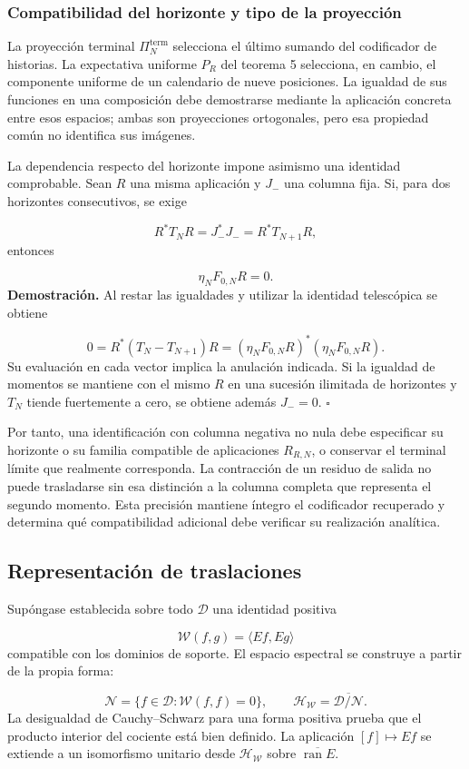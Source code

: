 \subsubsection*{Compatibilidad del horizonte y tipo de la proyección}
La proyección terminal \(\Pi_N^{\mathrm{term}}\) selecciona el último sumando del codificador de historias. La expectativa uniforme \(P_R\) del teorema 5 selecciona, en cambio, el componente uniforme de un calendario de nueve posiciones. La igualdad de sus funciones en una composición debe demostrarse mediante la aplicación concreta entre esos espacios; ambas son proyecciones ortogonales, pero esa propiedad común no identifica sus imágenes.

La dependencia respecto del horizonte impone asimismo una identidad comprobable. Sean \(R\) una misma aplicación y \(J_-\) una columna fija. Si, para dos horizontes consecutivos, se exige

\[
R^*T_NR=J_-^*J_-=R^*T_{N+1}R,
\]
entonces

\[
\eta_NF_{0,N}R=0.
\]
\textbf{Demostración.} Al restar las igualdades y utilizar la identidad telescópica se obtiene

\[
0=R^*(T_N-T_{N+1})R
=(\eta_NF_{0,N}R)^*(\eta_NF_{0,N}R).
\]
Su evaluación en cada vector implica la anulación indicada. Si la igualdad de momentos se mantiene con el mismo \(R\) en una sucesión ilimitada de horizontes y \(T_N\) tiende fuertemente a cero, se obtiene además \(J_-=0\). \hfill\(\square\)

Por tanto, una identificación con columna negativa no nula debe especificar su horizonte o su familia compatible de aplicaciones \(R_{R,N}\), o conservar el terminal límite que realmente corresponda. La contracción de un residuo de salida no puede trasladarse sin esa distinción a la columna completa que representa el segundo momento. Esta precisión mantiene íntegro el codificador recuperado y determina qué compatibilidad adicional debe verificar su realización analítica.

\subsection{Representación de traslaciones}
Supóngase establecida sobre todo \(\mathcal D\) una identidad positiva

\[
\mathscr W(f,g)=\langle Ef,Eg\rangle
\]
compatible con los dominios de soporte. El espacio espectral se construye a partir de la propia forma:

\[
\mathcal N=\{f\in\mathcal D:\mathscr W(f,f)=0\},\qquad
\mathcal H_{\mathscr W}
=\overline{\mathcal D/\mathcal N}.
\]
La desigualdad de Cauchy–Schwarz para una forma positiva prueba que el producto interior del cociente está bien definido. La aplicación \([f]\mapsto Ef\) se extiende a un isomorfismo unitario desde \(\mathcal H_{\mathscr W}\) sobre \(\overline{\operatorname{ran}E}\).

